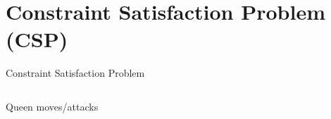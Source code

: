 \section{Constraint Satisfaction Problem (CSP)}

\begin{frame}{Constraint Satisfaction Problem}
  \begin{examples}
    \begin{columns}
      \begin{column}{.4\textwidth}
        \centering
        Queen moves/attacks\\ \medskip
      \end{column}
      \begin{column}{.6\textwidth}
        \centering
      \end{column}
    \end{columns}
  \end{examples}
\end{frame}

